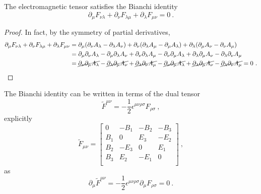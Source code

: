     The electromagnetic tensor satisfies the Bianchi identity 
    \begin{equation*}
        \partial_\mu F_{\nu\lambda} + \partial_\nu F_{\lambda \mu} + \partial_\lambda F_{\mu \nu} = 0 ~.
    \end{equation*}
    \begin{proof}
        In fact, by the symmetry of partial derivatives, 
        \begin{equation*}
        \begin{aligned}
            \partial_\mu F_{\nu\lambda} + \partial_\nu F_{\lambda \mu} + \partial_\lambda F_{\mu \nu} & = \partial_\mu (\partial_\nu A_\lambda - \partial_\lambda A_\nu) + \partial_\nu (\partial_\lambda A_\mu - \partial_\mu A_\lambda) + \partial_\lambda (\partial_\mu A_\nu - \partial_\nu A_\mu) \\ & = \partial_\mu \partial_\nu A_\lambda -  \partial_\mu \partial_\lambda A_\nu + \partial_\nu \partial_\lambda A_\mu - \partial_\nu  \partial_\mu A_\lambda + \partial_\lambda \partial_\mu A_\nu - \partial_\lambda \partial_\nu A_\mu \\ & = \cancel{\partial_\nu \partial_\mu A_\lambda} - \cancel{\partial_\lambda \partial_\mu A_\nu} +  \cancel{\partial_\lambda \partial_\nu A_\mu} - \cancel{\partial_\nu \partial_\mu A_\lambda} + \cancel{\partial_\lambda \partial_\mu A_\nu} - \cancel{\partial_\lambda \partial_\nu A_\mu} = 0 ~.
        \end{aligned}
        \end{equation*}
    \end{proof}
    The Bianchi identity can be written in terms of the dual tensor
    \begin{equation*}
        \tilde F^{\mu\nu} = - \frac{1}{2} \epsilon^{\mu\nu\rho\sigma} F_{\rho\sigma} ~,
    \end{equation*}
    explicitly 
    \begin{equation*}
        \tilde F_{\mu\nu} = \begin{bmatrix}
            0 & - B_1 & - B_2 & - B_3 \\ 
            B_1 & 0 & E_3 & -E_2 \\ 
            B_2 & -E_3 & 0 & E_1 \\ 
            B_3 & E_2 & -E_1 & 0 \\
        \end{bmatrix} ~,
    \end{equation*}
    as 
    \begin{equation*}
        \partial_\mu \tilde F^{\mu\nu} = - \frac{1}{2} \epsilon^{\mu\nu\rho\sigma} \partial_\mu  F_{\rho\sigma} = 0 ~.
    \end{equation*}

